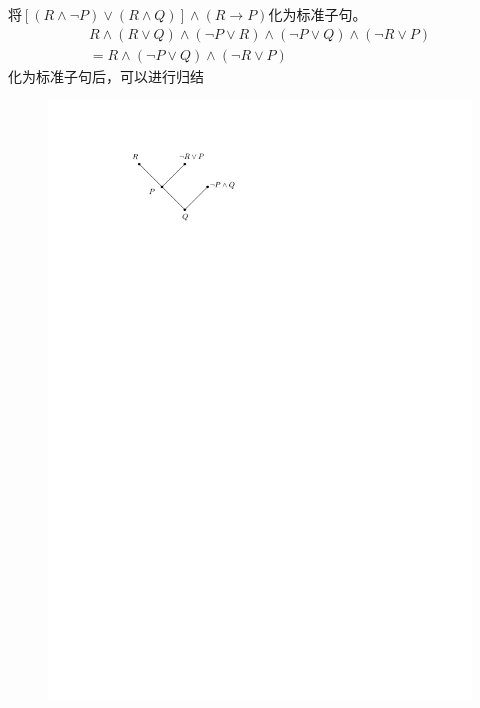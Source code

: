 \begin{example}
    将$\left[ \left( R\land \lnot P \right)\lor \left( R\land Q \right) \right]\land (R\to P)$化为标准子句。
    \[
        \begin{array}{l}
            R\land \left( R\lor Q \right)\land \left( \lnot P\lor R \right)\land \left( \lnot P\lor Q \right)\land \left( \lnot R\lor P \right)\\
            =R\land \left( \lnot P\lor Q \right)\land \left( \lnot R\lor P \right)
        \end{array}
    \]
    化为标准子句后，可以进行归结
    \begin{figure}[htbp]
        \centering
        \includegraphics{image/标准-归结.pdf}
    \end{figure}
\end{example}

